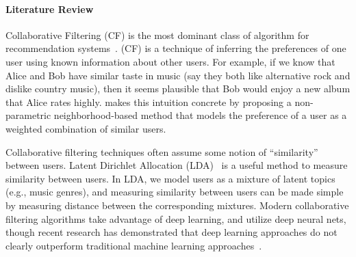 \documentclass{article}
\begin{document}
\paragraph*{Literature Review}
Collaborative Filtering (CF) is the most dominant class of algorithm for
recommendation systems~\citep{Anelli_2022}. (CF) is a technique of inferring 
the preferences of one user using known information about other users.
For example, if we know that Alice and Bob have similar taste in music (say
they both like alternative rock and dislike country music), then it seems
plausible that Bob would enjoy a new album that Alice rates highly.
\citet{herlockerAlgorithmicFrameworkPerforming1999} makes this intuition
concrete by proposing a non-parametric neighborhood-based method that models
the preference of a user as a weighted combination of similar users.

Collaborative filtering techniques often assume some notion of ``similarity''
between users.
Latent Dirichlet Allocation (LDA)~\citep{bleiLatentDirichletAllocation2001} is
a useful method to measure similarity between users.
In LDA, we model users as a mixture of latent topics (e.g., music genres), and
measuring similarity between users can be made simple by measuring distance
between the corresponding mixtures.
Modern collaborative filtering algorithms take advantage of deep learning, and
utilize deep neural nets, though recent research has demonstrated that deep
learning approaches do not clearly outperform traditional machine learning 
approaches~\citep{Anelli_2022}.


\newpage


\end{document}
